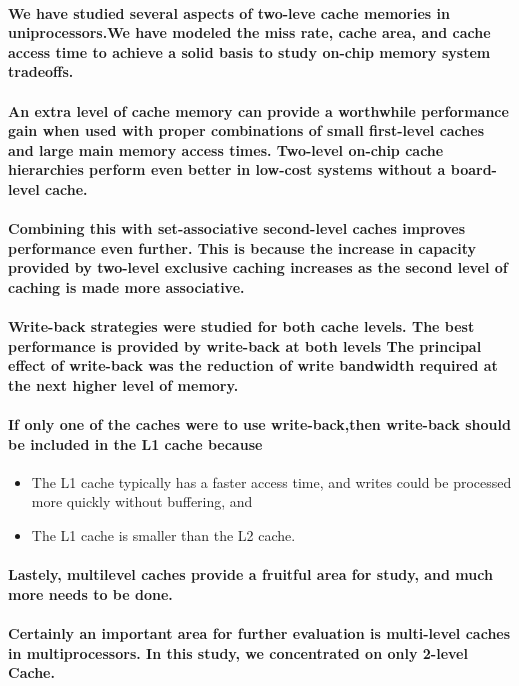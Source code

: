\documentclass{article}
\begin{document}
\paragraph{We have studied several aspects of two-leve cache memories in uniprocessors.We have 
modeled the miss rate, cache area, and cache access time to achieve a solid basis to
study on-chip memory system tradeoffs.}

\paragraph{An extra level of cache memory can provide a worthwhile 
performance gain when used with proper combinations
of small first-level caches and large main memory access times.
Two-level on-chip cache hierarchies perform even better in low-cost 
systems without a board-level cache.}

\paragraph{Combining this with set-associative second-level caches 
improves performance even further. This is because the increase in 
capacity provided by two-level exclusive caching increases as the 
second level of caching is made more associative.}

\paragraph{Write-back strategies were studied for both cache levels. 
The best performance is provided by write-back at both levels
The principal effect of write-back was the reduction of write 
bandwidth required at the next higher level of memory.}

\paragraph{If only one of the caches were to use write-back,then write-back
should be included in the L1 cache because}

\begin{itemize}
    \item The L1 cache typically has a faster access time, and writes
    could be processed more quickly without buffering, and

    \item The L1 cache is smaller than the L2 cache.

\end{itemize}

\paragraph{Lastely, multilevel caches provide a fruitful 
area for study, and much more needs to be done.}

\paragraph{Certainly an important area for further evaluation 
is multi-level caches in multiprocessors. In this study, we concentrated
on only 2-level Cache.}
\end{document}

